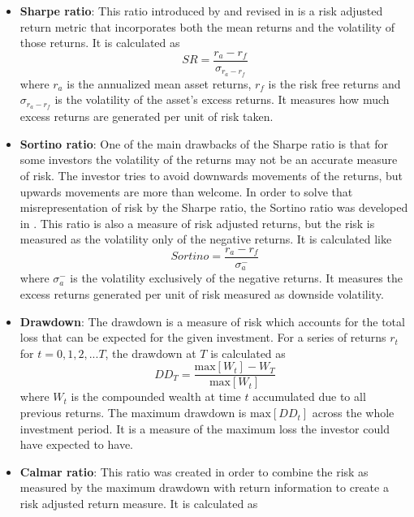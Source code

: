 \begin{itemize}
    \item \textbf{Sharpe ratio}: This ratio introduced by \cite{sharpe_1966} and revised in \cite{sharpe_1994} is a risk adjusted return metric that incorporates both the mean returns and the volatility of those returns. It is calculated as 
    \begin{equation}
        SR=\frac{r_a-r_f}{\sigma_{r_a-r_f}}
    \end{equation}
    where $r_a$ is the annualized mean asset returns, $r_f$ is the risk free returns and $\sigma_{r_a-r_f}$ is the volatility of the asset's excess returns. 
    It measures how much excess returns are generated per unit of risk taken.
    \item \textbf{Sortino ratio}: One of the main drawbacks of the Sharpe ratio is that for some investors the volatility of the returns may not be an accurate measure of risk. The investor tries to avoid downwards movements of the returns, but upwards movements are more than welcome. In order to solve that misrepresentation of risk by the Sharpe ratio, the Sortino ratio was developed in \cite{sortino_1994}. This ratio is also a measure of risk adjusted returns, but the risk is measured as the volatility only of the negative returns. It is calculated like
    \begin{equation}
        Sortino=\frac{r_a-r_f}{\sigma^-_a}
    \end{equation}
    where $\sigma_a^-$ is the volatility exclusively of the negative returns. 
    It measures the excess returns generated per unit of risk measured as downside volatility. 
    \item \textbf{Drawdown}: The drawdown is a measure of risk which accounts for the total loss that can be expected for the given investment. For a series of returns $r_t$ for $t=0,1,2,...T$, the drawdown at $T$ is calculated as 
    \begin{equation}
        DD_T=\frac{\text{max}\left[W_t\right]-W_T}{\text{max}\left[W_t\right]}
    \end{equation}
    where $W_t$ is the compounded wealth at time $t$ accumulated due to all previous returns. The maximum drawdown is $\text{max}\left[DD_t\right]$ across the whole investment period. It is a measure of the maximum loss the investor could have expected to have.
    \item \textbf{Calmar ratio}: This ratio was created in order to combine the risk as measured by the maximum drawdown with return information to create a risk adjusted return measure. It is calculated as 

\end{itemize}
